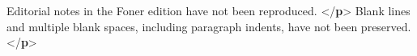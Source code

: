 \begin{shaded}
\hspace*{1em}\hspace*{1em}\hspace*{1em}\hspace*{1em}\mbox{}\newline 
\hspace*{1em}\hspace*{1em}\hspace*{1em}\mbox{}\newline 
\hspace*{1em}\hspace*{1em}\mbox{}\newline 
\hspace*{1em}\mbox{}\newline 
{}\mbox{}\newline 
{}\mbox{}\newline 
\hspace*{1em}\mbox{}\newline 
\hspace*{1em}\hspace*{1em}Editorial notes in the Foner edition have not\mbox{}\newline 
\hspace*{1em}\hspace*{1em}\hspace*{1em}\hspace*{1em}\hspace*{1em}\hspace*{1em} been reproduced. {</\textbf{p}>}\mbox{}\newline 
\hspace*{1em}\hspace*{1em}Blank lines and multiple blank spaces, including paragraph\mbox{}\newline 
\hspace*{1em}\hspace*{1em}\hspace*{1em}\hspace*{1em}\hspace*{1em}\hspace*{1em} indents, have not been preserved. {</\textbf{p}>}\mbox{}\newline 

\end{shaded}
